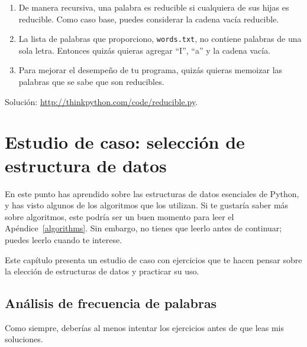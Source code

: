 \documentclass[10pt]{book}
\begin{document}
\begin{exercise}
\begin{enumerate}
\item De manera recursiva, una palabra es reducible si cualquiera de sus hijas
es reducible.  Como caso base, puedes considerar la cadena vacía
reducible.

\item La lista de palabras que proporciono, {\tt words.txt}, no
contiene palabras de una sola letra.  Entonces quizás quieras agregar
``I'', ``a'' y la cadena vacía.

\item Para mejorar el desempeño de tu programa, quizás quieras
memoizar las palabras que se sabe que son reducibles.

\end{enumerate}

Solución: \url{http://thinkpython.com/code/reducible.py}.

\end{exercise}








\chapter{Estudio de caso: selección de estructura de datos}

En este punto has aprendido sobre las estructuras de datos esenciales de Python,
y has visto algunos de los algoritmos que los utilizan.
Si te gustaría saber más sobre algoritmos, este podría ser un buen
momento para leer el Apéndice~\ref{algorithms}.
Sin embargo, no tienes que leerlo antes de continuar; puedes leerlo
cuando te interese.

Este capítulo presenta un estudio de caso con ejercicios que te hacen
pensar sobre la elección de estructuras de datos y practicar su uso.


\section{Análisis de frecuencia de palabras}
\label{analysis}

Como siempre, deberías al menos intentar los ejercicios
antes de que leas mis soluciones.
\end{document}
